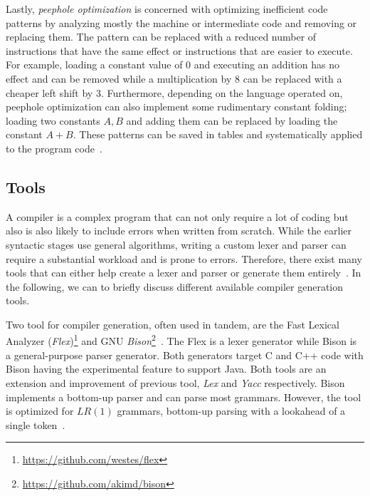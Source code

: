 Lastly, \emph{peephole optimization} is concerned with optimizing inefficient code patterns by analyzing mostly the machine or intermediate code and removing or replacing them. The pattern can be replaced with a reduced number of instructions that have the same effect or instructions that are easier to execute. For example, loading a constant value of $0$ and executing an addition has no effect and can be removed while a multiplication by $8$ can be replaced with a cheaper left shift by $3$. Furthermore, depending on the language operated on, peephole optimization can also implement some rudimentary constant folding; loading two constants $A, B$ and adding them can be replaced by loading the constant $A + B$. These patterns can be saved in tables and systematically applied to the program code~\cite{McKe65,TvS82}.

\subsection{Tools}
\label{sec:background_compilerTools}
A compiler is a complex program that can not only require a lot of coding but also is also likely to include errors when written from scratch. While the earlier syntactic stages use general algorithms, writing a custom lexer and parser can require a substantial workload and is prone to errors. Therefore, there exist many tools that can either help create a lexer and parser or generate them entirely~\cite{PaFi11, ZLY17}. In the following, we can to briefly discuss different available compiler generation tools.

Two tool for compiler generation, often used in tandem, are the Fast Lexical Analyzer (\emph{Flex})\footnote{\url{https://github.com/westes/flex}} and GNU \emph{Bison}\footnote{\url{https://github.com/akimd/bison}}~\cite{DoSt99}. 
The Flex is a lexer generator while Bison is a general-purpose parser generator. Both generators target C and C++ code with Bison having the experimental feature to support Java. 
Both tools are an extension and improvement of previous tool, \emph{Lex} and \emph{Yacc} respectively. 
Bison implements a bottom-up parser and can parse most grammars. However, the tool is optimized for $LR(1)$ grammars, \ie bottom-up parsing with a lookahead of a single token~\cite{ZLY17,Aaby03,DoSt99}. 

